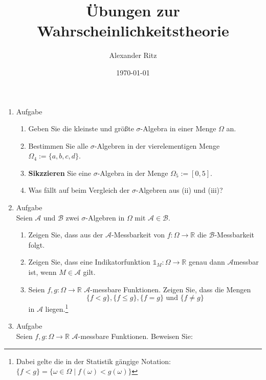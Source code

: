 \documentclass[12pt,a4paper]{article}
\title{Übungen zur Wahrscheinlichkeitstheorie}
\author{Alexander Ritz}
\date{\today}
\begin{document}
\maketitle

\begin{enumerate}

\item Aufgabe 
\begin{enumerate}[label=(\roman*)]

\item Geben Sie die kleinste und größte $\sigma$-Algebra in einer Menge $\Omega$ an.

\item Bestimmen Sie alle $\sigma$-Algebren in der vierelementigen Menge $\Omega_4:=\{a, b, c, d\}$.

\item\textbf{Sikzzieren} Sie eine $\sigma$-Algebra in der Menge $\Omega_5:= \left[0, 5 \right]$.

\item Was fällt auf beim Vergleich der $\sigma$-Algebren aus (ii) und (iii)?

\end{enumerate}


\item Aufgabe \\
Seien $\mathscr{A}$ und $\mathscr{B}$ zwei $\sigma$-Algebren in $\Omega$ mit $\mathscr{A} \in \mathscr{B}$.
\begin{enumerate}[label=(\roman*)]

\item Zeigen Sie, dass aus der $\mathscr{A}$-Messbarkeit von $f:\Omega \to \mathbb{R}$ die $\mathscr{B}$-Messbarkeit folgt.

\item Zeigen Sie, dass eine Indikatorfunktion $\mathds{1}_M:\Omega \to \mathbb{R}$ genau dann $\mathscr{A}$messbar ist, wenn $M \in \mathscr{A}$ gilt.

\item Seien $f, g: \Omega\to \mathbb{R}$ $\mathscr{A}$-messbare Funktionen. Zeigen Sie, dass die Mengen \[\{f < g\}, \{f \leq g\}, \{f = g\}\text{ und }\{ f \neq g\}\] in $\mathscr{A}$ liegen.\footnote{Dabei gelte die in der Statistik gängige Notation: $\{f < g\} = \{\omega \in \Omega \mid f(\omega) < g(\omega)\}$}


\end{enumerate}

\item Aufgabe \\
Seien $f, g: \Omega\to \mathbb{R}$ $\mathscr{A}$-messbare Funktionen.  Beweisen Sie:
\begin{enumerate}[label=(\roman*)]


\end{enumerate}
\end{enumerate}
\end{document}
